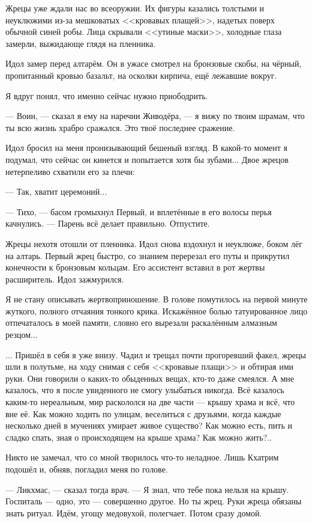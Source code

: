 Жрецы уже ждали нас во всеоружии.
Их фигуры казались толстыми и неуклюжими из-за мешковатых <<кровавых плащей>>, надетых поверх обычной синей робы.
Лица скрывали <<утиные маски>>, холодные глаза замерли, выжидающе глядя на пленника.

Идол замер перед алтарём.
Он в ужасе смотрел на бронзовые скобы, на чёрный, пропитанный кровью базальт, на осколки кирпича, ещё лежавшие вокруг.

Я вдруг понял, что именно сейчас нужно приободрить.

--- Воин, --- сказал я ему на наречии Живодёра, --- я вижу по твоим шрамам, что ты всю жизнь храбро сражался.
Это твоё последнее сражение.

Идол бросил на меня пронизывающий бешеный взгляд.
В какой-то момент я подумал, что сейчас он кинется и попытается хотя бы зубами...
Двое жрецов нетерпеливо схватили его за плечи:

--- Так, хватит церемоний...

--- Тихо, --- басом громыхнул Первый, и вплетённые в его волосы перья качнулись.
--- Парень всё делает правильно.
Отпустите.

Жрецы нехотя отошли от пленника.
Идол снова вздохнул и неуклюже, боком лёг на алтарь.
Первый жрец быстро, со знанием перерезал его путы и прикрутил конечности к бронзовым кольцам.
Его ассистент вставил в рот жертвы расширитель.
Идол зажмурился.

Я не стану описывать жертвоприношение.
В голове помутилось на первой минуте жуткого, полного отчаяния тонкого крика.
Искажённое болью татуированное лицо отпечаталось в моей памяти, словно его вырезали раскалённым алмазным резцом...

... Пришёл в себя я уже внизу.
Чадил и трещал почти прогоревший факел, жрецы шли в полутьме, на ходу снимая с себя <<кровавые плащи>> и обтирая ими руки.
Они говорили о каких-то обыденных вещах, кто-то даже смеялся.
А мне казалось, что я после увиденного не смогу улыбаться никогда.
Всё казалось каким-то нереальным, мир раскололся на две части --- крышу храма и всё, что вне её.
Как можно ходить по улицам, веселиться с друзьями, когда каждые несколько дней в мучениях умирает живое существо?
Как можно есть, пить и сладко спать, зная о происходящем на крыше храма?
Как можно жить?..

Никто не замечал, что со мной творилось что-то неладное.
Лишь Кхатрим подошёл и, обняв, погладил меня по голове.

--- Ликхмас, --- сказал тогда врач.
--- Я знал, что тебе пока нельзя на крышу.
Госпиталь --- одно, это --- совершенно другое.
Но ты жрец.
Руки жреца обязаны знать ритуал.
Идём, угощу медовухой, полегчает.
Потом сразу домой.

